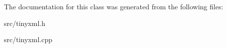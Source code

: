 \-The documentation for this class was generated from the following files\-:\begin{DoxyCompactItemize}
\item 
src/tinyxml.\-h\item 
src/tinyxml.\-cpp\end{DoxyCompactItemize}
